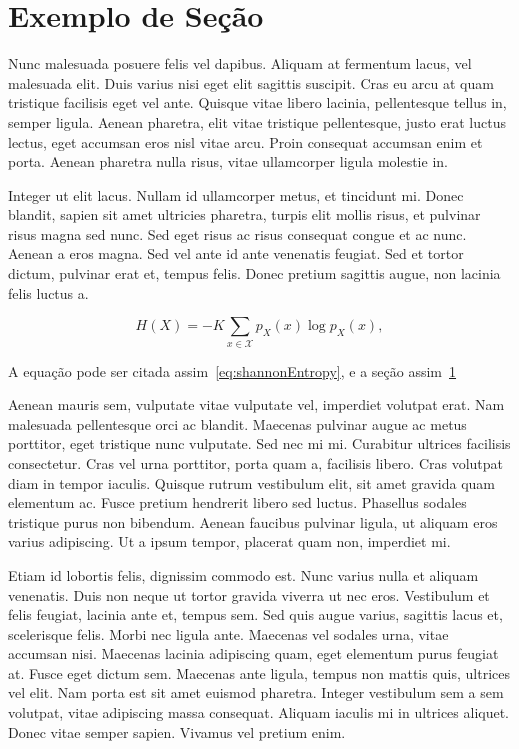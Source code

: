 \section{Exemplo de Se\c{c}\~{a}o}
\label{sec:sec02}

Nunc malesuada posuere felis vel dapibus. Aliquam at fermentum lacus, vel malesuada elit. Duis varius nisi eget elit sagittis suscipit. Cras eu arcu at quam tristique facilisis eget vel ante. Quisque vitae libero lacinia, pellentesque tellus in, semper ligula. Aenean pharetra, elit vitae tristique pellentesque, justo erat luctus lectus, eget accumsan eros nisl vitae arcu. Proin consequat accumsan enim et porta. Aenean pharetra nulla risus, vitae ullamcorper ligula molestie in.

Integer ut elit lacus. Nullam id ullamcorper metus, et tincidunt mi. Donec blandit, sapien sit amet ultricies pharetra, turpis elit mollis risus, et pulvinar risus magna sed nunc. Sed eget risus ac risus consequat congue et ac nunc. Aenean a eros magna. Sed vel ante id ante venenatis feugiat. Sed et tortor dictum, pulvinar erat et, tempus felis. Donec pretium sagittis augue, non lacinia felis luctus a.

\begin{equation}
H(X) =-K\sum_{x\in\mathcal{X}} p_X(x)\log p_X(x),
\label{eq:shannonEntropy}
\end{equation}

A equa\c{c}\~{a}o pode ser citada assim~\eqref{eq:shannonEntropy}, e a se\c{c}\~{a}o assim~\ref{sec:sec02}

Aenean mauris sem, vulputate vitae vulputate vel, imperdiet volutpat erat. Nam malesuada pellentesque orci ac blandit. Maecenas pulvinar augue ac metus porttitor, eget tristique nunc vulputate. Sed nec mi mi. Curabitur ultrices facilisis consectetur. Cras vel urna porttitor, porta quam a, facilisis libero. Cras volutpat diam in tempor iaculis. Quisque rutrum vestibulum elit, sit amet gravida quam elementum ac. Fusce pretium hendrerit libero sed luctus. Phasellus sodales tristique purus non bibendum. Aenean faucibus pulvinar ligula, ut aliquam eros varius adipiscing. Ut a ipsum tempor, placerat quam non, imperdiet mi.

Etiam id lobortis felis, dignissim commodo est. Nunc varius nulla et aliquam venenatis. Duis non neque ut tortor gravida viverra ut nec eros. Vestibulum et felis feugiat, lacinia ante et, tempus sem. Sed quis augue varius, sagittis lacus et, scelerisque felis. Morbi nec ligula ante. Maecenas vel sodales urna, vitae accumsan nisi. Maecenas lacinia adipiscing quam, eget elementum purus feugiat at. Fusce eget dictum sem. Maecenas ante ligula, tempus non mattis quis, ultrices vel elit. Nam porta est sit amet euismod pharetra. Integer vestibulum sem a sem volutpat, vitae adipiscing massa consequat. Aliquam iaculis mi in ultrices aliquet. Donec vitae semper sapien. Vivamus vel pretium enim.

